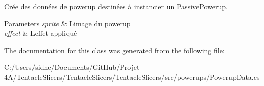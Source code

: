 Crée des données de powerup destinées à instancier un \hyperlink{class_tentacle_slicers_1_1powerups_1_1_passive_powerup}{Passive\+Powerup}. 


\begin{DoxyParams}{Parameters}
{\em sprite} & L\textquotesingle{}image du powerup \\
\hline
{\em effect} & L\textquotesingle{}effet appliqué \\
\hline
\end{DoxyParams}


The documentation for this class was generated from the following file\+:\begin{DoxyCompactItemize}
\item 
C\+:/\+Users/sidne/\+Documents/\+Git\+Hub/\+Projet 4\+A/\+Tentacle\+Slicers/\+Tentacle\+Slicers/\+Tentacle\+Slicers/src/powerups/Powerup\+Data.\+cs\end{DoxyCompactItemize}
